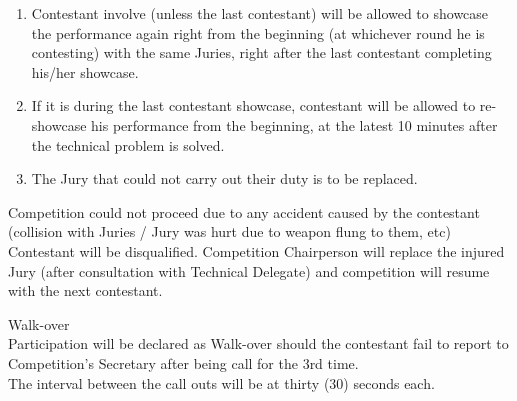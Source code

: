 \begin{legal}
\begin{legal}
\begin{legal}
\begin{enumerate}[label*=\alph*.]
                    \begin{enumerate}[label*=\arabic*.]
                    \item Contestant involve (unless the last contestant) will be allowed to showcase the performance again right from the beginning (at whichever round he is contesting) with the same Juries, right after the last contestant completing his/her showcase.
                    \item If it is during the last contestant showcase, contestant will be allowed to re-showcase his performance from the beginning, at the latest 10 minutes after the technical problem is solved.
                    \item The Jury that could not carry out their duty is to be replaced.
                    \end{enumerate}
                \end{enumerate}

            \item \label{pt:tunggal_accident} Competition could not proceed due to any accident caused by the contestant (collision with 
                Juries / Jury was hurt due to weapon flung to them, etc) Contestant will be disqualified. 
                Competition Chairperson will replace the injured Jury (after consultation with Technical Delegate) 
                and competition will resume with the next contestant.
            \end{legal}

            \item Walk-over \\
                Participation will be declared as Walk-over should the contestant fail to report to 
                Competition’s Secretary after being call for the 3rd time.\\
                The interval between the call outs will be at thirty (30) seconds each.


\end{legal}
\end{legal}
